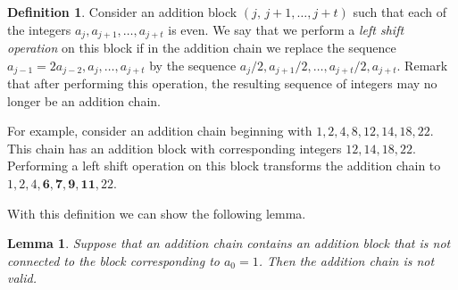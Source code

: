 \documentclass{article}
\newtheorem{lemma}[theorem]{Lemma}
\theoremstyle{definition}
\newtheorem{definition}{Definition}[section]
\begin{document}





\begin{definition}
Consider an addition block $(j,\, j+1,\ldots, j+t)$ such that each of the integers $a_j, a_{j+1},\ldots, a_{j+t}$ is even.  We say that we perform a {\it left shift operation} on this block if in the addition chain we replace the sequence $a_{j-1}=2a_{j-2}, a_j, \ldots, a_{j+t}$ by the sequence $a_{j}/2,a_{j+1}/2,\ldots, a_{j+t}/2, a_{j+t}$.  Remark that after performing this operation, the resulting sequence of integers may no longer be an addition chain. 
\end{definition}

For example, consider an addition chain beginning with $1,2,4,8,12,14,18,22$. This chain has an addition block with corresponding integers $12,14,18,22$. Performing a left shift operation on this block transforms the addition chain to  $1, 2, 4,\mathbf{6, 7, 9, 11},  22$.

With this definition we can show the following lemma. 
 
\begin{lemma}\label{t23} Suppose that an addition chain contains an addition block that is not connected to the block corresponding to $a_0=1$. Then the addition chain is not valid.
\end{lemma}
\end{document}

